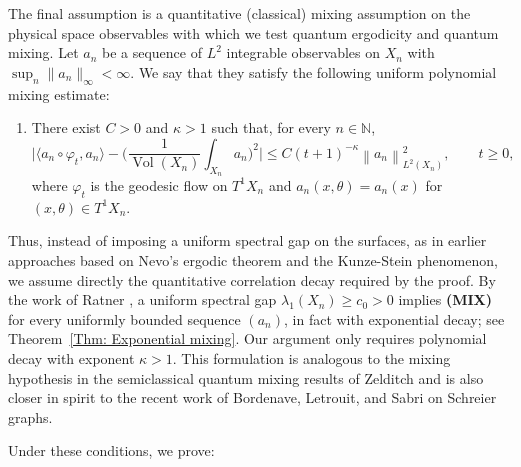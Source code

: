 \documentclass[11pt,twoside,reqno]{amsart}
\newcommand{\N}{\mathbb{N}}
\renewcommand{\phi}{\varphi}
\newcommand{\1}{\mathrm{\mathbf{1}}}
\DeclareMathOperator{\Vol}{Vol}
\newcommand{\norm}[1]{\left\lVert#1\right\rVert}
\numberwithin{equation}{section}
\theoremstyle{plain}
\theoremstyle{definition}
\theoremstyle{remark}
\begin{document}
The final assumption is a quantitative (classical) mixing assumption on the physical space observables with which we test quantum ergodicity and quantum mixing. Let $a_n$ be a sequence of $L^2$ integrable observables on $X_n$ with $\sup_n\|a_n\|_\infty<\infty$. We say that they satisfy the following uniform polynomial mixing estimate:
\begin{enumerate}[label={ABC}]
    \item[\textbf{(MIX)}:] There exist $C>0$ and $\kappa>1$ such that, for every $n\in\N$,
    \[
    \Big|
        \langle a_n\circ\phi_t,a_n\rangle
        -
        \Big(\frac{1}{\Vol(X_n)}\int_{X_n}a_n\Big)^2
    \Big|
    \leq
    C(t+1)^{-\kappa}\norm{a_n}_{L^2(X_n)}^2,
    \qquad t\geq0,
    \]
    where $\phi_t$ is the geodesic flow on $T^1X_n$ and $a_n(x,\theta)=a_n(x)$ for $(x,\theta)\in T^1X_n$.
\end{enumerate}

Thus, instead of imposing a uniform spectral gap on the surfaces, as in earlier approaches based on Nevo's ergodic theorem and the Kunze-Stein phenomenon, we assume directly the quantitative correlation decay required by the proof. By the work of Ratner \cite{Ratner}, a uniform spectral gap $\lambda_1(X_n)\geq c_0>0$ implies \textbf{(MIX)} for every uniformly bounded sequence $(a_n)$, in fact with exponential decay; see Theorem~\ref{Thm: Exponential mixing}. Our argument only requires polynomial decay with exponent $\kappa>1$. This formulation is analogous to the mixing hypothesis in the semiclassical quantum mixing results of Zelditch \cite{Zel96a} and is also closer in spirit to the recent work of Bordenave, Letrouit, and Sabri \cite{bordenave2026quantummixinglargeschreier} on Schreier graphs.

Under these conditions, we prove:
\end{document}
